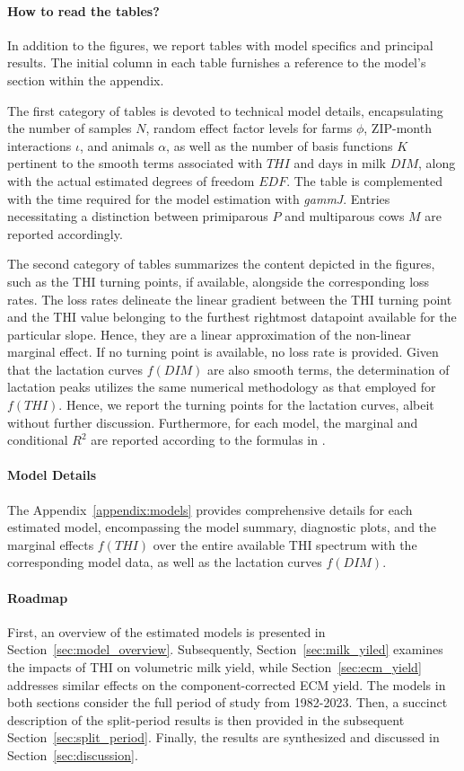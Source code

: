 \paragraph{How to read the tables?} In addition to the figures, we report tables with model specifics and principal results. The initial column in each table furnishes a reference to the model's section within the appendix.

The first category of tables is devoted to technical model details, encapsulating the number of samples $N$, random effect factor levels for farms $\phi$, ZIP-month interactions $\iota$, and animals $\alpha$, as well as the number of basis functions $K$ pertinent to the smooth terms associated with $THI$ and days in milk $DIM$, along with the actual estimated degrees of freedom $EDF$. The table is complemented with the time required for the model estimation with \textit{gammJ}. Entries necessitating a distinction between primiparous $P$ and multiparous cows $M$ are reported accordingly.

The second category of tables summarizes the content depicted in the figures, such as the THI turning points, if available, alongside the corresponding loss rates. The loss rates delineate the linear gradient between the THI turning point and the THI value belonging to the furthest rightmost datapoint available for the particular slope. Hence, they are a linear approximation of the non-linear marginal effect. If no turning point is available, no loss rate is provided. Given that the lactation curves $f(DIM)$ are also smooth terms, the determination of lactation peaks utilizes the same numerical methodology as that employed for $f(THI)$. Hence, we report the turning points for the lactation curves, albeit without further discussion. Furthermore, for each model, the marginal and conditional $R^2$ are reported according to the formulas in \citet[Equation 29 and Equation 30]{nakagawa_general_2013}.

\paragraph{Model Details} The Appendix~\ref{appendix:models} provides comprehensive details for each estimated model, encompassing the model summary, diagnostic plots, and the marginal effects $f(THI)$ over the entire available THI spectrum with the corresponding model data, as well as the lactation curves $f(DIM)$.

\paragraph{Roadmap} First, an overview of the estimated models is presented in Section~\ref{sec:model_overview}. Subsequently, Section~\ref{sec:milk_yiled} examines the impacts of THI on volumetric milk yield, while Section~\ref{sec:ecm_yield} addresses similar effects on the component-corrected ECM yield. The models in both sections consider the full period of study from 1982-2023. Then, a succinct description of the split-period results is then provided in the subsequent Section~\ref{sec:split_period}. Finally, the results are synthesized and discussed in Section~\ref{sec:discussion}.

